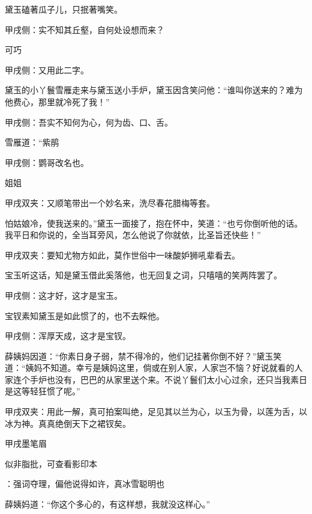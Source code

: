 \begin{parag}
    黛玉磕著瓜子儿，只抿著嘴笑。\begin{note}甲戌侧：实不知其丘壑，自何处设想而来？\end{note}可巧\begin{note}甲戌侧：又用此二字。\end{note}黛玉的小丫鬟雪雁走来与黛玉送小手炉，黛玉因含笑问他：“谁叫你送来的？难为他费心，那里就冷死了我！”\begin{note}甲戌侧：吾实不知何为心，何为齿、口、舌。\end{note}雪雁道：“紫鹃\begin{note}甲戌侧：鹦哥改名也。\end{note}姐姐\begin{note}甲戌双夹：又顺笔带出一个妙名来，洗尽春花腊梅等套。\end{note}怕姑娘冷，使我送来的。”黛玉一面接了，抱在怀中，笑道：“也亏你倒听他的话。我平日和你说的，全当耳旁风，怎么他说了你就依，比圣旨还快些！”\begin{note}甲戌双夹：要知尤物方如此，莫作世俗中一味酸妒狮吼辈看去。\end{note}宝玉听这话，知是黛玉借此奚落他，也无回复之词，只嘻嘻的笑两阵罢了。\begin{note}甲戌侧：这才好，这才是宝玉。\end{note}宝钗素知黛玉是如此惯了的，也不去睬他。\begin{note}甲戌侧：浑厚天成，这才是宝钗。\end{note}薛姨妈因道：“你素日身子弱，禁不得冷的，他们记挂著你倒不好？”黛玉笑道：“姨妈不知道。幸亏是姨妈这里，倘或在别人家，人家岂不恼？好说就看的人家连个手炉也没有，巴巴的从家里送个来。不说丫鬟们太小心过余，还只当我素日是这等轻狂惯了呢。”\begin{note}甲戌双夹：用此一解，真可拍案叫绝，足见其以兰为心，以玉为骨，以莲为舌，以冰为神。真真绝倒天下之裙钗矣。\end{note}\begin{note}甲戌墨笔眉\begin{subnote}似非脂批，可查看影印本\end{subnote}：强词夺理，偏他说得如许，真冰雪聪明也\end{note}薛姨妈道：“你这个多心的，有这样想，我就没这样心。”
\end{parag}


